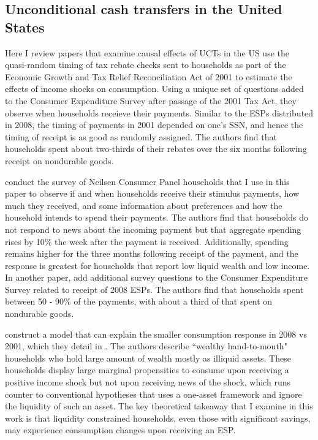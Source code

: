 \documentclass[12pt]{article}
\begin{document}
\subsection{Unconditional cash transfers in the United States}

Here I review papers that examine causal effects of UCTs in the US \textcite{johnson2006household} use the quasi-random timing of tax rebate checks sent to households as part of the Economic Growth and Tax Relief Reconciliation Act of 2001 to estimate the effects of income shocks on consumption.
Using a unique set of questions added to the Consumer Expenditure Survey after passage of the 2001 Tax Act, they observe when households receieve their payments.
Similar to the ESPs distributed in 2008, the timing of payments in 2001 depended on one's SSN, and hence the timing of receipt is as good as randomly assigned.
The authors find that households spent about two-thirds of their rebates over the six months following receipt on nondurable goods.

\textcite{broda2014economic} conduct the survey of Neilsen Consumer Panel households that I use in this paper to observe if and when households receive their stimulus payments, how much they received, and some information about preferences and how the household intends to spend their payments.
The authors find that households do not respond to news about the incoming payment but that aggregate spending rises by 10\% the week after the payment is received.
Additionally, spending remains higher for the three months following receipt of the payment, and the response is greatest for households that report low liquid wealth and low income.
In another paper, \textcite{parker2013consumer} add additional survey questions to the Consumer Expenditure Survey related to receipt of 2008 ESPs.
The authors find that households spent between 50 - 90\% of the payments, with about a third of that spent on nondurable goods.

\textcite{kaplan2014model} construct a model that can explain the smaller consumption response in 2008 vs 2001, which they detail in \textcite{kaplan2014tale}.
The authors describe ``wealthy hand-to-mouth" households who hold large amount of wealth mostly as illiquid assets.
These households display large marginal propensities to consume upon receiving a positive income shock but not upon receiving news of the shock, which runs counter to conventional hypotheses that uses a one-asset framework and ignore the liquidity of such an asset.
The key theoretical takeaway that I examine in this work is that liquidity constrained households, even those with significant savings, may experience consumption changes upon receiving an ESP.
\end{document}
